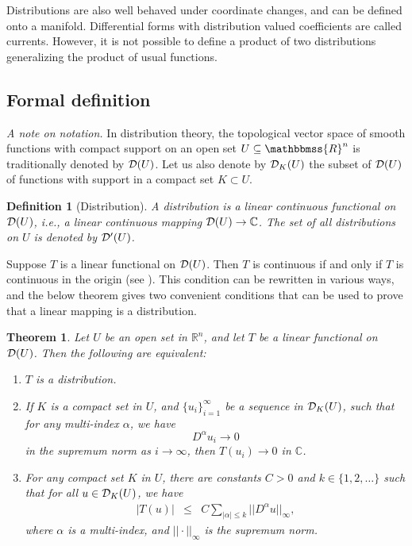 \documentclass[12pt]{article}
\newcommand{\sR}[0]{\mathbb{R}}
\newcommand{\sC}[0]{\mathbb{C}}
\newcommand{\R}{\mathbbmss{R}}
\newtheorem{thm}{Theorem}
\newtheorem{defn}{Definition}
\begin{document}
Distributions are also well behaved under coordinate changes, and 
can be defined onto a manifold. Differential forms with 
distribution valued coefficients are called currents. 
However, it is not possible to define a product of two 
distributions generalizing the product of usual functions. 


\subsection*{Formal definition}

\emph{A note on notation.} In distribution theory, the 
topological vector space of smooth functions with compact support on 
an open set $U\subseteq \R^n$
is traditionally denoted by $\mathcal{D}(U)$. Let us also denote by 
$\mathcal{D}_K(U)$ the subset of $\mathcal{D}(U)$ of functions with support in a 
compact set $K\subset U$.

\begin{defn}[Distribution] 
A \emph{distribution} is a linear continuous functional on $\mathcal{D}(U)$,
i.e., a linear continuous mapping $\cD(U)\to\sC$. 
The set of all distributions on $U$ is denoted by $\mathcal{D}'(U)$. 
\end{defn}

Suppose $T$ is a linear functional on $\mathcal{D}(U)$. 
Then  $T$ is continuous if and only if $T$ is continuous
in the origin (see ).
This condition can be rewritten in various ways, and 
the below theorem gives two convenient conditions that can be used to prove
that a linear mapping is a distribution. 

\begin{thm}
Let $U$ be an open set in $\sR^n$, 
and let $T$ be a linear functional on $\mathcal{D}(U)$. Then the
following are equivalent:
\begin{enumerate}
\item $T$ is a distribution.
\item If $K$ is a compact set in $U$, and  
$\{u_i\}_{i=1}^\infty$ be a sequence in $\mathcal{D}_K(U)$, such that
for any multi-index $\alpha$, we have 
$$ 
   D^\alpha u_i \to 0
$$
in the supremum norm as $i\to \infty$, 
then $T(u_i) \to 0$ in $\sC$. 
\item For any compact set $K$ in $U$, there are constants $C>0$ and 
$k\in\{1,2,\ldots\}$ such that for all $u\in \mathcal{D}_K(U)$, we have
\begin{eqnarray}
\label{ineq1}
|T(u)| &\le& C \sum_{|\alpha|\le k} ||D^\alpha u ||_\infty,
\end{eqnarray}
where $\alpha$ is a multi-index, and 
$||\cdot||_\infty$ is the supremum norm.
\end{enumerate}
\end{thm}
\end{document}
